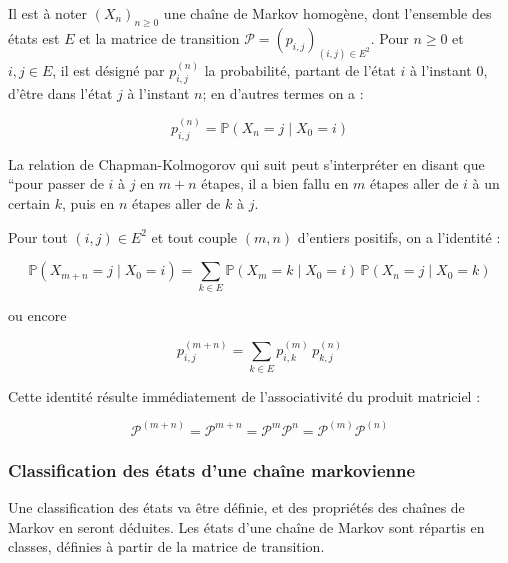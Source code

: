 \begin{sloppypar}
Il est à noter $(X_n)_{n \geq 0}$ une chaîne de Markov homogène, dont l’ensemble des états est $E$ et la matrice de transition $\mathcal{P} = (p_{i,j})_{(i,j) \in E^2}$. Pour $n \geq 0$ et $i, j \in E$, il est désigné par $p^{(n)}_{i,j}$ la probabilité, partant de l’état $i$
à l’instant $0$, d’être dans l’état $j$ à l’instant $n$; en d’autres termes on a :

\begin{equation}
 p^{(n)}_{i,j} = \mathbb{P}(X_n = j \mid X_0 = i)   
\end{equation}

La relation de Chapman-Kolmogorov qui suit peut s’interpréter en disant que “pour passer de $i$ à $j$ en
$m + n$ étapes, il a bien fallu en $m$ étapes aller de $i$ à un certain $k$, puis en $n$ étapes aller de $k$ à $j$.

\begin{tcolorbox}[colback=green!5!white,colframe=green!75!black,title=Proposition]
Pour tout $(i, j) \in E^2$ et tout couple $(m, n)$ d’entiers positifs, on a l’identité :
    
\begin{equation}
 \mathbb{P}(X_{m+n} = j \mid X_0 = i) = \sum_{k \in E} \mathbb{P}(X_m = k \mid X_0 = i) \, \mathbb{P}(X_n = j \mid X_0 = k)   
\end{equation}
    
ou encore
    
\begin{equation}
  p^{(m+n)}_{i,j} = \sum_{k \in E} p^{(m)}_{i,k} \, p^{(n)}_{k,j}
\end{equation}
\end{tcolorbox}

Cette identité résulte immédiatement de l’associativité du produit matriciel :

\begin{equation}
 \mathcal{P}^{(m+n)} = \mathcal{P}^{m+n} = \mathcal{P}^m \mathcal{P}^n = \mathcal{P}^{(m)} \mathcal{P}^{(n)}   
\end{equation}

\subsubsection{Classification des états d'une chaîne markovienne}

Une classification des états va être définie, et des propriétés des chaînes de Markov en seront déduites. Les 
états d’une chaîne de Markov sont répartis en classes, définies à partir de la matrice de transition.


\end{sloppypar}
